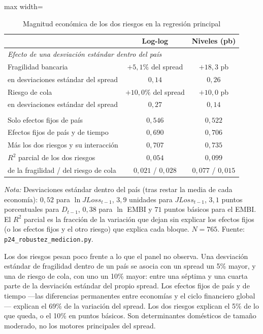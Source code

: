 \begin{table}[htbp]
\centering
\small
\caption[Magnitud económica de los dos riesgos]{Magnitud económica de los dos riesgos en la regresión principal}
\label{tab:magnitud}
\begin{adjustbox}{max width=\linewidth}
\begin{tabular}{l cc}
\toprule
 & Log-log & Niveles (pb) \\
\midrule
\multicolumn{3}{l}{\textit{Efecto de una desviación estándar dentro del país}} \\
\quad Fragilidad bancaria & $+5{,}1\%$ del spread & $+18{,}3$ pb \\
\quad \quad en desviaciones estándar del spread & $0{,}14$ & $0{,}26$ \\
\quad Riesgo de cola & $+10{,}0\%$ del spread & $+10{,}0$ pb \\
\quad \quad en desviaciones estándar del spread & $0{,}27$ & $0{,}14$ \\
\addlinespace
\multicolumn{3}{l}{\textit{Variación del spread explicada ($R^2$)}} \\
\quad Solo efectos fijos de país & $0{,}546$ & $0{,}522$ \\
\quad Efectos fijos de país y de tiempo & $0{,}690$ & $0{,}706$ \\
\quad Más los dos riesgos y su interacción & $0{,}707$ & $0{,}735$ \\
\quad $R^2$ parcial de los dos riesgos & $0{,}054$ & $0{,}099$ \\
\quad \quad de la fragilidad / del riesgo de cola & $0{,}021$ / $0{,}028$ & $0{,}077$ / $0{,}015$ \\
\bottomrule
\end{tabular}
\end{adjustbox}
\par\smallskip\parbox{0.95\linewidth}{\footnotesize \textit{Nota:} Desviaciones estándar dentro del país (tras restar la media de cada economía): $0{,}52$ para $\ln JLoss_{t-1}$, $3{,}9$ unidades para $JLoss_{t-1}$, $3{,}1$ puntos porcentuales para $D_{t-1}$, $0{,}38$ para $\ln$ EMBI y $71$ puntos básicos para el EMBI. El $R^2$ parcial es la fracción de la variación que dejan sin explicar los efectos fijos (o los efectos fijos y el otro riesgo) que explica cada bloque. $N=765$. Fuente: \texttt{p24\_robustez\_medicion.py}.}
\end{table}

Los dos riesgos pesan poco frente a lo que el panel no observa. Una desviación estándar de fragilidad dentro de un país se asocia con un spread un 5\% mayor, y una de riesgo de cola, con uno un 10\% mayor: entre una séptima y una cuarta parte de la desviación estándar del propio spread. Los efectos fijos de país y de tiempo ---las diferencias permanentes entre economías y el ciclo financiero global--- explican el 69\% de la variación del spread. Los dos riesgos explican el 5\% de lo que queda, o el 10\% en puntos básicos. Son determinantes domésticos de tamaño moderado, no los motores principales del spread.

